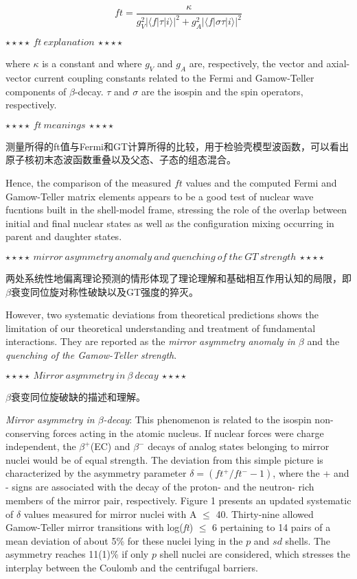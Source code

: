 \documentclass[a4paper]{article}
\begin{document}
\begin{equation}
    ft=\frac{\kappa}{g^{2}_{V}\Big|\langle f|\tau|i \rangle\Big|^{2}+g^{2}_{A}\Big|\langle f|\sigma\tau|i \rangle\Big|^{2}}
\end{equation}

$\star\star\star\star~ft~explanation~\star\star\star\star$

where $\kappa$ is a constant and where $g_{V}$ and $g_{A}$ are, respectively, the vector and axial-vector current coupling constants related to the Fermi and Gamow-Teller components of $\beta$-decay. $\tau$ and $\sigma$ are the isospin and the spin operators, respectively. 

$\star\star\star\star~ft~meanings~\star\star\star\star$

测量所得的ft值与Fermi和GT计算所得的比较，用于检验壳模型波函数，可以看出原子核初末态波函数重叠以及父态、子态的组态混合。

Hence, the comparison of the measured $ft$ values and the computed Fermi and Gamow-Teller matrix elements appears to be a good test of nuclear wave fucntions built in the shell-model frame, stressing the role of the overlap between initial and final nuclear states as well as the configuration mixing occurring in parent and daughter states. 

$\star\star\star\star~mirror~asymmetry~anomaly~and~quenching~of~the~GT~strength~\star\star\star\star$

两处系统性地偏离理论预测的情形体现了理论理解和基础相互作用认知的局限，即 $\beta$衰变同位旋对称性破缺以及GT强度的猝灭。

However, two systematic deviations from theoretical predictions shows the limitation of our theoretical understanding and treatment of fundamental interactions. They are reported as the \textit{mirror asymmetry anomaly in $\beta$} and the \textit{quenching of the Gamow-Teller strength}.

$\star\star\star\star~Mirror~asymmetry~in~\beta~decay~\star\star\star\star$

$\beta$衰变同位旋破缺的描述和理解。

\textit{Mirror asymmetry in $\beta$-decay}: This phenomenon is related to the isospin non-conserving forces acting in the atomic nucleus. If nuclear forces were charge independent, the $\beta^{+}$(EC) and $\beta^{-}$ decays of analog states belonging to mirror nuclei would be of equal strength. The deviation from this simple picture is characterized by the asymmetry parameter $\delta=\left( ft^{+}/ft^{-}-1 \right)$, where the + and - signs are associated with the decay of the proton- and the neutron- rich members of the mirror pair, respectively. Figure 1 presents an updated systematic of $\delta$ values measured for mirror nuclei with A $\leq$ 40. Thirty-nine allowed Gamow-Teller mirror transitions with log(\textit{ft}) $\leq$ 6 pertaining to 14 pairs of a mean deviation of about 5\% for these nuclei lying in the $p$ and $sd$ shells. The asymmetry reaches 11(1)\% if only $p$ shell nuclei are considered, which stresses the interplay between the Coulomb and the centrifugal barriers.
\end{document}
